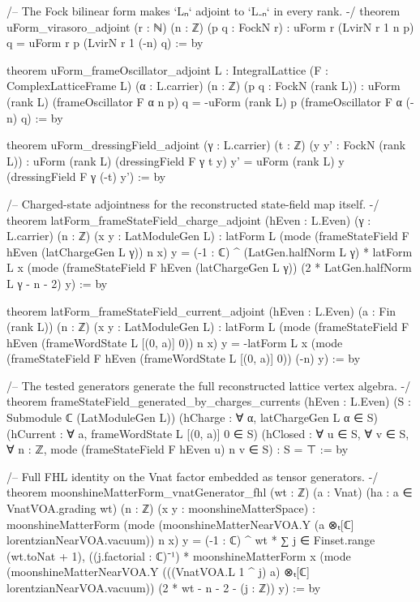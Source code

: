 \begin{leancode}
/-- The Fock bilinear form makes `Lₙ` adjoint to `L₋ₙ` in every rank. -/
theorem uForm_virasoro_adjoint (r : ℕ) (n : ℤ) (p q : FockN r) :
    uForm r (LvirN r 1 n p) q = uForm r p (LvirN r 1 (-n) q) := by

theorem uForm_frameOscillator_adjoint {L : IntegralLattice} (F : ComplexLatticeFrame L)
    (α : L.carrier) (n : ℤ) (p q : FockN (rank L)) :
    uForm (rank L) (frameOscillator F α n p) q =
      -uForm (rank L) p (frameOscillator F α (-n) q) := by

theorem uForm_dressingField_adjoint (γ : L.carrier) (t : ℤ) (y y' : FockN (rank L)) :
    uForm (rank L) (dressingField F γ t y) y' = uForm (rank L) y (dressingField F γ (-t) y') := by

/-- Charged-state adjointness for the reconstructed state-field map itself. -/
theorem latForm_frameStateField_charge_adjoint (hEven : L.Even) (γ : L.carrier)
    (n : ℤ) (x y : LatModuleGen L) :
    latForm L (mode (frameStateField F hEven (latChargeGen L γ)) n x) y =
      (-1 : ℂ) ^ (LatGen.halfNorm L γ) *
        latForm L x (mode (frameStateField F hEven (latChargeGen L γ))
          (2 * LatGen.halfNorm L γ - n - 2) y) := by

theorem latForm_frameStateField_current_adjoint (hEven : L.Even) (a : Fin (rank L))
    (n : ℤ) (x y : LatModuleGen L) :
    latForm L (mode (frameStateField F hEven (frameWordState L [(0, a)] 0)) n x) y =
      -latForm L x
        (mode (frameStateField F hEven (frameWordState L [(0, a)] 0)) (-n) y) := by

/-- The tested generators generate the full reconstructed lattice vertex algebra. -/
theorem frameStateField_generated_by_charges_currents (hEven : L.Even)
    (S : Submodule ℂ (LatModuleGen L))
    (hCharge : ∀ α, latChargeGen L α ∈ S)
    (hCurrent : ∀ a, frameWordState L [(0, a)] 0 ∈ S)
    (hClosed : ∀ u ∈ S, ∀ v ∈ S, ∀ n : ℤ,
      mode (frameStateField F hEven u) n v ∈ S) : S = ⊤ := by

/-- Full FHL identity on the Vnat factor embedded as tensor generators. -/
theorem moonshineMatterForm_vnatGenerator_fhl (wt : ℤ) (a : Vnat)
    (ha : a ∈ VnatVOA.grading wt) (n : ℤ) (x y : moonshineMatterSpace) :
    moonshineMatterForm
      (mode (moonshineMatterNearVOA.Y (a ⊗ₜ[ℂ] lorentzianNearVOA.vacuum)) n x) y =
      (-1 : ℂ) ^ wt * ∑ j ∈ Finset.range (wt.toNat + 1), ((j.factorial : ℂ)⁻¹) *
        moonshineMatterForm x
          (mode (moonshineMatterNearVOA.Y
            (((VnatVOA.L 1 ^ j) a) ⊗ₜ[ℂ] lorentzianNearVOA.vacuum))
            (2 * wt - n - 2 - (j : ℤ)) y) := by
\end{leancode}

